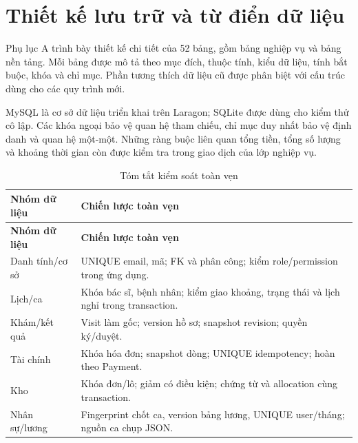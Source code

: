 \clearpage

\section{Thiết kế lưu trữ và từ điển dữ liệu}
Phụ lục A trình bày thiết kế chi tiết của 52 bảng, gồm bảng nghiệp vụ và bảng nền tảng.\allowbreak{} Mỗi bảng được mô tả theo mục đích, thuộc tính, kiểu dữ liệu, tính bắt buộc, khóa và chỉ mục.\allowbreak{} Phần tương thích dữ liệu cũ được phân biệt với cấu trúc dùng cho các quy trình mới.\allowbreak{}

My\allowbreak{}SQL là cơ sở dữ liệu triển khai trên Laragon; SQLite được dùng cho kiểm thử cô lập.\allowbreak{} Các khóa ngoại bảo vệ quan hệ tham chiếu, chỉ mục duy nhất bảo vệ định danh và quan hệ một-một.\allowbreak{} Những ràng buộc liên quan tổng tiền, tổng số lượng và khoảng thời gian còn được kiểm tra trong giao dịch của lớp nghiệp vụ.\allowbreak{}


{\small\setlength{\tabcolsep}{3pt}\renewcommand{\arraystretch}{1.12}
\begin{longtable}{@{}L{\textwidth-1.5pt\relax} L{\textwidth-4.5pt\relax}@{}}
\caption{Tóm tắt kiểm soát toàn vẹn}\\
\toprule
\textbf{Nhóm dữ liệu} & \textbf{Chiến lược toàn vẹn}\\\midrule
\endfirsthead
\toprule
\textbf{Nhóm dữ liệu} & \textbf{Chiến lược toàn vẹn}\\\midrule
\endhead
\bottomrule\endlastfoot
Danh tính/\allowbreak{}cơ sở & UNIQUE email, mã; FK và phân công; kiểm role/\allowbreak{}permission trong ứng dụng.\allowbreak{}\\[3pt]
Lịch/\allowbreak{}ca & Khóa bác sĩ, bệnh nhân; kiểm giao khoảng, trạng thái và lịch nghỉ trong transaction.\allowbreak{}\\[3pt]
Khám/\allowbreak{}kết quả & Visit làm gốc; version hồ sơ; snapshot revision; quyền ký/\allowbreak{}duyệt.\allowbreak{}\\[3pt]
Tài chính & Khóa hóa đơn; snapshot dòng; UNIQUE idempotency; hoàn theo Payment.\allowbreak{}\\[3pt]
Kho & Khóa đơn/\allowbreak{}lô; giảm có điều kiện; chứng từ và allocation cùng transaction.\allowbreak{}\\[3pt]
Nhân sự/\allowbreak{}lương & Fingerprint chốt ca, version bảng lương, UNIQUE user/\allowbreak{}tháng; nguồn ca chụp JSON.\allowbreak{}\\[3pt]
\end{longtable}}
